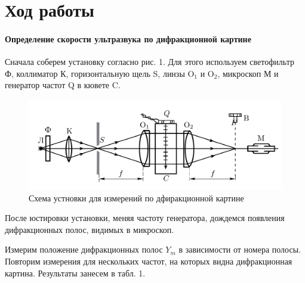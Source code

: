 \documentclass[a4paper,12pt]{article}
\newcommand{\n}{\hfill \break}
\begin{document}
\newpage
\section*{Ход работы}
\paragraph{Определение скорости ультразвука по дифракционной картине}\n
Сначала соберем установку согласно рис. 1. Для этого используем светофильтр Ф, коллиматор К, горизонтальную щель S, линзы O$_1$ и O$_2$, микроскоп М и генератор частот Q в кювете C.

\begin{figure}[H]
    \centering
    \includegraphics[scale=0.3]{schema_1.png}
    \caption{Схема устновки для измерений по дфиракционной картине}
\end{figure}

\noindent
После юстировки установки, меняя частоту генератора, дождемся появления дифракционных полос, видимых в микроскоп. 

\noindent
Измерим положение дифракционных полос $Y_m$ в зависимости от номера полосы. Повторим измерения для нескольких частот, на которых видна дифракционная картина. Результаты занесем в табл. 1.

\begin{table}[H]
    \centering
    \caption{Координаты дифракционных максимумов при различных частотах}
\end{table}
\end{document}
